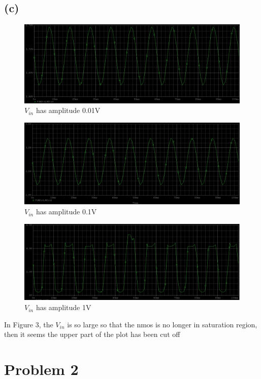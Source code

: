 \documentclass[12pt]{article}
\begin{document}
\subsection{(c)}
\begin{figure}[H]
\centering
\includegraphics[scale=0.25]{P2.png}
\caption{$V_{in}$ has amplitude 0.01V}
\end{figure}
\begin{figure}[H]
\centering
\includegraphics[scale=0.25]{P3.png}
\caption{$V_{in}$ has amplitude 0.1V}
\end{figure}
\begin{figure}[H]
\centering
\includegraphics[scale=0.25]{P4.png}
\caption{$V_{in}$ has amplitude 1V}
\end{figure}
In Figure 3, the $V_{in}$ is so large so that the nmos is no longer in saturation region, then it seems the upper part of the plot has been cut off
\section{Problem 2}
\end{document}
